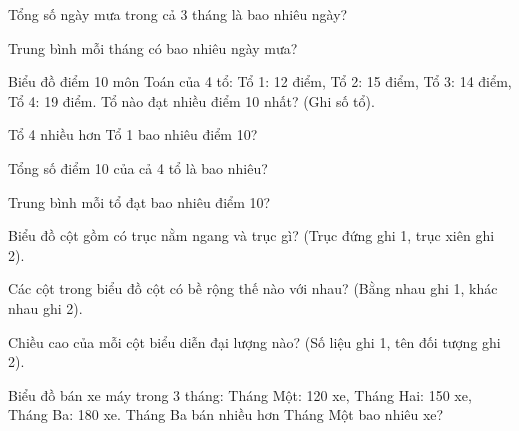 \begin{ex}
Tổng số ngày mưa trong cả 3 tháng là bao nhiêu ngày?
\end{ex}

\begin{ex}
Trung bình mỗi tháng có bao nhiêu ngày mưa?
\end{ex}

\begin{ex}
Biểu đồ điểm 10 môn Toán của 4 tổ: Tổ 1: 12 điểm, Tổ 2: 15 điểm, Tổ 3: 14 điểm, Tổ 4: 19 điểm. Tổ nào đạt nhiều điểm 10 nhất? (Ghi số tổ).
\end{ex}

\begin{ex}
Tổ 4 nhiều hơn Tổ 1 bao nhiêu điểm 10?
\end{ex}

\begin{ex}
Tổng số điểm 10 của cả 4 tổ là bao nhiêu?
\end{ex}

\begin{ex}
Trung bình mỗi tổ đạt bao nhiêu điểm 10?
\end{ex}

\begin{ex}
Biểu đồ cột gồm có trục nằm ngang và trục gì? (Trục đứng ghi 1, trục xiên ghi 2).
\end{ex}

\begin{ex}
Các cột trong biểu đồ cột có bề rộng thế nào với nhau? (Bằng nhau ghi 1, khác nhau ghi 2).
\end{ex}

\begin{ex}
Chiều cao của mỗi cột biểu diễn đại lượng nào? (Số liệu ghi 1, tên đối tượng ghi 2).
\end{ex}

\begin{ex}
Biểu đồ bán xe máy trong 3 tháng: Tháng Một: 120 xe, Tháng Hai: 150 xe, Tháng Ba: 180 xe. Tháng Ba bán nhiều hơn Tháng Một bao nhiêu xe?
\end{ex}

